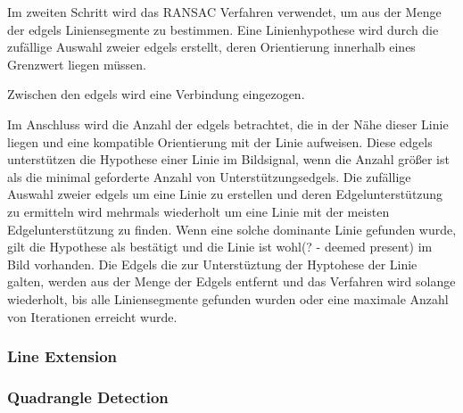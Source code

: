 Im zweiten Schritt wird das RANSAC Verfahren verwendet, um aus der Menge der \gls{edgels} Liniensegmente zu bestimmen. Eine Linienhypothese wird durch die zufällige Auswahl zweier \gls{edgels} erstellt, deren Orientierung innerhalb eines Grenzwert liegen müssen.

Zwischen den \gls{edgels} wird eine Verbindung eingezogen.

Im Anschluss wird die Anzahl der \gls{edgels} betrachtet, die in der Nähe dieser Linie liegen und eine kompatible Orientierung mit der Linie aufweisen. Diese \gls{edgels} unterstützen die Hypothese einer Linie im Bildsignal, wenn die Anzahl größer ist als die minimal geforderte Anzahl von Unterstützungsedgels. Die zufällige Auswahl zweier \gls{edgels} um eine Linie zu erstellen und deren Edgelunterstützung zu ermitteln wird mehrmals wiederholt um eine Linie mit der meisten Edgelunterstützung zu finden. Wenn eine solche dominante Linie gefunden wurde, gilt die Hypothese als bestätigt und die Linie ist wohl(? - deemed present) im Bild vorhanden. Die Edgels die zur Unterstüztung der Hyptohese der Linie galten, werden aus der Menge der Edgels entfernt und das Verfahren wird solange wiederholt, bis alle Liniensegmente gefunden wurden oder eine maximale Anzahl von Iterationen erreicht wurde.

\subsubsection{Line Extension} %
\label{sub:line_extension}

\subsubsection{Quadrangle Detection} %
\label{sub:quadrangle_detection}

